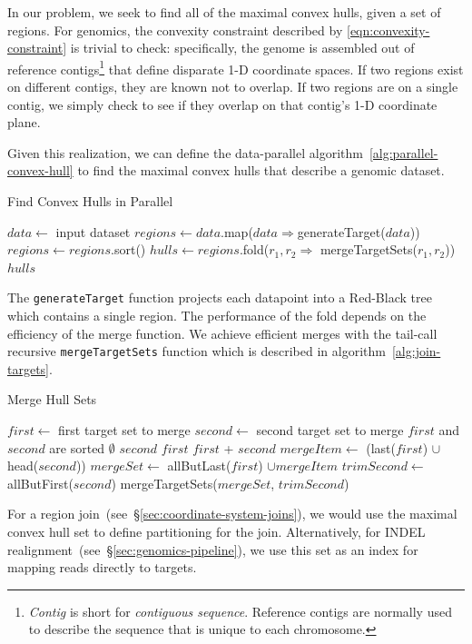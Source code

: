 \documentclass{acm_proc_article-sp}
\begin{document}
In our problem, we seek to find all of the maximal convex hulls, given a set of regions. For genomics, the
convexity constraint described by \eqref{eqn:convexity-constraint} is trivial to check: specifically, the
genome is assembled out of reference contigs\footnote{\emph{Contig} is short for \emph{contiguous
sequence}. Reference contigs are normally used to describe the sequence that is unique to each
chromosome.} that define disparate 1-D coordinate spaces. If two regions exist on different contigs, they
are known not to overlap. If two regions are on a single contig, we simply check to see if they overlap
on that contig's 1-D coordinate plane.

Given this realization, we can define the data-parallel algorithm~\ref{alg:parallel-convex-hull} to find the
maximal convex hulls that describe a genomic dataset.

\begin{algorithm}
\caption{Find Convex Hulls in Parallel}
\label{alg:parallel-convex-hull}
\begin{algorithmic}
\STATE $data \leftarrow$ input dataset
\STATE $regions \leftarrow data$.map($data \Rightarrow $generateTarget($data$))
\STATE $regions \leftarrow regions$.sort()
\STATE $hulls \leftarrow regions$.fold($r_1, r_2 \Rightarrow$ mergeTargetSets($r_1, r_2$))
\RETURN $hulls$
\end{algorithmic}
\end{algorithm}

The \texttt{generateTarget} function projects each datapoint into a Red-Black tree which contains a
single region. The performance of the fold depends on the efficiency of the merge function. We achieve
efficient merges with the tail-call recursive \texttt{mergeTargetSets} function which is described in
algorithm~\ref{alg:join-targets}.

\begin{algorithm}
\caption{Merge Hull Sets}
\label{alg:join-targets}
\begin{algorithmic}
\STATE $first \leftarrow$ first target set to merge
\STATE $second \leftarrow$ second target set to merge
\REQUIRE $first$ and $second$ are sorted
\RETURN $\emptyset$
\RETURN $second$
\RETURN $first$
\ELSE
{}
\RETURN $first$ + $second$
\ELSE
\STATE $mergeItem \leftarrow$ (last($first$) $\cup$ head($second$))
\STATE $mergeSet \leftarrow$ allButLast($first$) $\cup mergeItem$
\STATE $trimSecond \leftarrow$ allButFirst($second$)
\RETURN mergeTargetSets($mergeSet$, $trimSecond$)
\ENDIF
\ENDIF
\end{algorithmic}
\end{algorithm}

For a region join~(see~\S\ref{sec:coordinate-system-joins}), we would use the maximal convex hull
set to define partitioning for the join. Alternatively, for INDEL
realignment~(see~\S\ref{sec:genomics-pipeline}), we use this set as an index for mapping reads directly
to targets.

\balance
\end{document}
